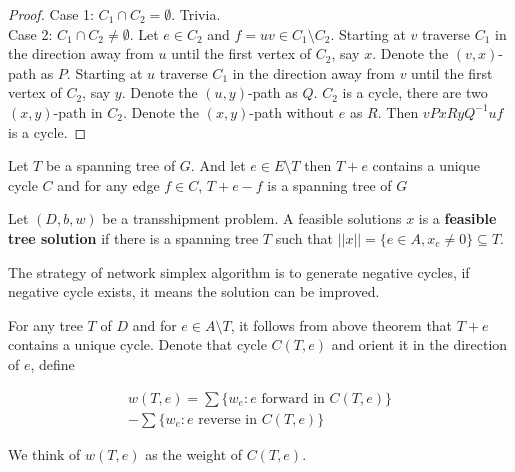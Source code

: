 			\begin{proof}
				Case 1: $C_1 \cap C_2 = \emptyset$. Trivia.\\
				Case 2: $C_1 \cap C_2 \neq \emptyset$. Let $e\in C_2$ and $f=uv \in C_1 \setminus C_2$. Starting at $v$ traverse $C_1$ in the direction away from $u$ until the first vertex of $C_2$, say $x$. Denote the $(v, x)$-path as $P$. Starting at $u$ traverse $C_1$ in the direction away from $v$ until the first vertex of $C_2$, say $y$. Denote the $(u, y)$-path as $Q$. $C_2$ is a cycle, there are two $(x, y)$-path in $C_2$. Denote the $(x, y)$-path without $e$ as $R$. Then $vPxRyQ^{-1}uf$ is a cycle.
			\end{proof}

			\begin{theorem}
				Let $T$ be a spanning tree of $G$. And let $e\in E\setminus T$ then $T+e$ contains a unique cycle $C$ and for any edge $f\in C$, $T+e-f$ is a spanning tree of $G$
			\end{theorem}

			Let $(D, b, w)$ be a transshipment problem. A feasible solutions $x$ is a \textbf{feasible tree solution} if there is a spanning tree $T$ such that $||x|| = \{e\in A, x_e\neq 0\} \subseteq T$.

			The strategy of network simplex algorithm is to generate negative cycles, if negative cycle exists, it means the solution can be improved.

			For any tree $T$ of $D$ and for $e\in A\setminus T$, it follows from above theorem that $T+e$ contains a unique cycle. Denote that cycle $C(T, e)$ and orient it in the direction of $e$, define 

			\begin{eqnarray}
				w(T, e) = \sum\{w_e: e \text{ forward in } C(T, e)\} \nonumber \\ 
						- \sum\{w_e: e \text{ reverse in } C(T, e)\}
			\end{eqnarray}

			We think of $w(T, e)$ as the weight of $C(T,e)$.

